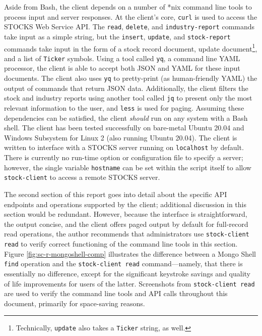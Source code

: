 \documentclass[
11pt,
titlepage,
]{article}
\begin{document}
Aside from Bash, the client depends on a number of *nix command line tools to
process input and server responses. At the client's core, \texttt{curl} is used
to access the STOCKS Web Service API. The \texttt{read}, \texttt{delete}, and
\texttt{industry-report} commands take input as a simple string, but the
\texttt{insert}, \texttt{update}, and \texttt{stock-report} commands take input
in the form of a stock record document, update document\footnote{Technically,
\texttt{update} also takes a \texttt{Ticker} string, as well.}, and a list of
\texttt{Ticker} symbols. Using a tool called \texttt{yq}, a command line YAML
processor, the client is able to accept both JSON and YAML for these input
documents. The client also uses \texttt{yq} to pretty-print (as human-friendly
YAML) the output of commands that return JSON data. Additionally, the client
filters the stock and industry reports using another tool called \texttt{jq} to
present only the most relevant information to the user, and \texttt{less} is
used for paging. Assuming these dependencies can be satisfied, the client
\textit{should} run on any system with a Bash shell. The client has been tested
successfully on bare-metal Ubuntu 20.04 and Windows Subsystem for Linux 2 (also
running Ubuntu 20.04). The client is written to interface with a STOCKS server
running on \texttt{localhost} by default. There is currently no run-time option
or configuration file to specify a server; however, the single variable
\texttt{hostname} can be set within the script itself to allow
\texttt{stock-client} to access a remote STOCKS server.

The second section of this report goes into detail about the specific API
endpoints and operations supported by the client; additional discussion in this
section would be redundant. However, because the interface is straightforward,
the output concise, and the client offers paged output by default for
full-record read operations, the author recommends that administrators use
\texttt{stock-client read} to verify correct functioning of the command line
tools in this section. Figure \ref{fig:sc-r-mongoshell-comp} illustrates the
difference between a Mongo Shell \texttt{find} operation and the
\texttt{stock-client read} command---namely, that there is essentially no
difference, except for the significant keystroke savings and quality of life
improvements for users of the latter. Screenshots from \texttt{stock-client
read} are used to verify the command line tools and API calls throughout this
document, primarily for space-saving reasons.
\end{document}
